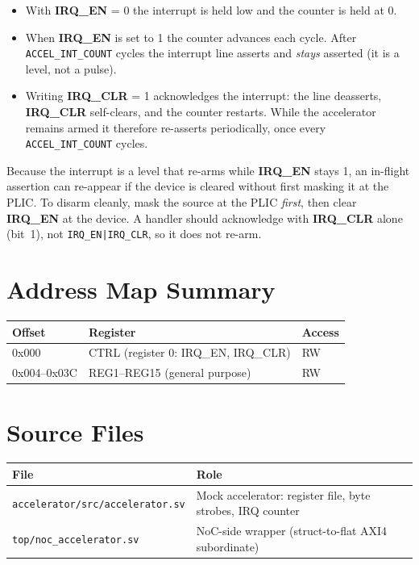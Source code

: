 \begin{itemize}[nosep]
  \item With \textbf{IRQ\_EN} = 0 the interrupt is held low and the counter is held at 0.
  \item When \textbf{IRQ\_EN} is set to 1 the counter advances each cycle. After
        \texttt{ACCEL\_INT\_COUNT} cycles the interrupt line asserts and \emph{stays} asserted (it is a
        level, not a pulse).
  \item Writing \textbf{IRQ\_CLR} = 1 acknowledges the interrupt: the line deasserts, \textbf{IRQ\_CLR}
        self-clears, and the counter restarts. While the accelerator remains armed it therefore
        re-asserts periodically, once every \texttt{ACCEL\_INT\_COUNT} cycles.
\end{itemize}

\begin{docwarning}
Because the interrupt is a level that re-arms while \textbf{IRQ\_EN} stays 1, an in-flight assertion can
re-appear if the device is cleared without first masking it at the PLIC. To disarm cleanly, mask the
source at the PLIC \emph{first}, then clear \textbf{IRQ\_EN} at the device. A handler should acknowledge
with \textbf{IRQ\_CLR} alone (bit~1), not \texttt{IRQ\_EN|IRQ\_CLR}, so it does not re-arm.
\end{docwarning}

\section{Address Map Summary}

\begin{tabular}{@{}lll@{}}
\toprule
\textbf{Offset} & \textbf{Register} & \textbf{Access} \\
\midrule
0x000        & CTRL (register 0: IRQ\_EN, IRQ\_CLR) & RW \\
0x004--0x03C & REG1--REG15 (general purpose)        & RW \\
\bottomrule
\end{tabular}

\section{Source Files}

\begin{tabular}{@{}ll@{}}
\toprule
\textbf{File} & \textbf{Role} \\
\midrule
\texttt{accelerator/src/accelerator.sv} & Mock accelerator: register file, byte strobes, IRQ counter \\
\texttt{top/noc\_accelerator.sv}        & NoC-side wrapper (struct-to-flat AXI4 subordinate) \\
\bottomrule
\end{tabular}

\newpage

